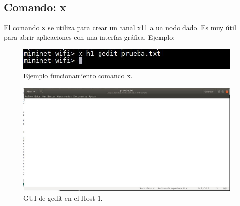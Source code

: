\subsection{Comando: x}
El comando \textbf{x} se utiliza para crear un canal x11 a un nodo dado. Es muy útil para abrir aplicaciones con una interfaz gráfica. Ejemplo:
\begin{figure}[!htb]
  \centering
    \includegraphics[width=0.7\linewidth]{./img/cli/13.JPG}
    \caption{Ejemplo funcionamiento comando x.}
  \label{fig:yo}
\end{figure}
\newpage
\begin{figure}[!htb]
  \centering
    \includegraphics[width=\linewidth]{./img/cli/14.JPG}
    \caption{GUI de gedit en el Host 1.}
  \label{fig:yo}
\end{figure}
